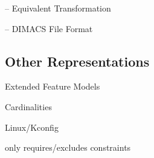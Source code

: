 \begin{frame}{-- Equivalent Transformation}
	
\end{frame}

\begin{frame}{-- DIMACS File Format}
	
\end{frame}


\subsection{Other Representations} %

\begin{frame}{\myframetitle}
	Extended Feature Models
	

	Cardinalities

	Linux/Kconfig %

	only requires/excludes constraints
\end{frame}







